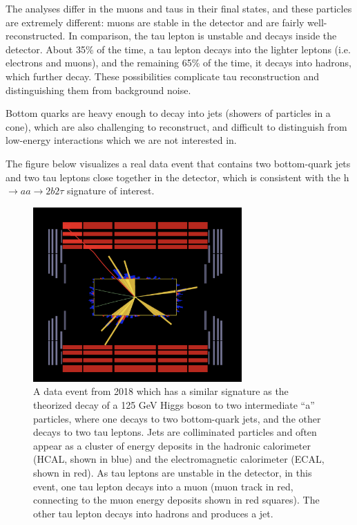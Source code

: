 \documentclass{article}
\begin{document}
The analyses differ in the muons and taus in their final states, and these particles are extremely different: muons are stable in the detector and are fairly well-reconstructed. 
In comparison, the tau lepton is unstable and decays inside the detector. About 35\% of the time, a tau lepton decays into the lighter leptons (i.e. electrons and muons), and the remaining 65\% of the time, it decays into hadrons, 
which further decay. These possibilities complicate tau reconstruction and distinguishing them from background noise. 

Bottom quarks are heavy enough to decay into jets (showers of particles in a cone), which are also challenging to reconstruct, and difficult to distinguish from low-energy interactions which we are not interested in.

The figure below visualizes a real data event that contains two bottom-quark jets and two tau leptons close together in the detector, which is consistent with the h $\rightarrow aa \rightarrow 2b2\tau$ signature of interest.

\begin{figure}[ht]
    \centering
    \includegraphics[width=8cm]{fireworks_event1/event1_barrel_slice.png}
    \caption{A data event from 2018 which has a similar signature as the theorized decay of a 125 GeV Higgs boson to two intermediate ``a'' particles, where one decays to two bottom-quark jets,
    and the other decays to two tau leptons. Jets are colliminated particles and often appear as a cluster of energy deposits in the hadronic calorimeter (HCAL, shown in blue) and the electromagnetic calorimeter (ECAL, shown in red). 
    As tau leptons are unstable in the detector, in this event, one tau lepton decays into a muon (muon track in red, connecting to the muon energy deposits shown in red squares).
    The other tau lepton decays into hadrons and produces a jet.}
\end{figure}
\end{document}

